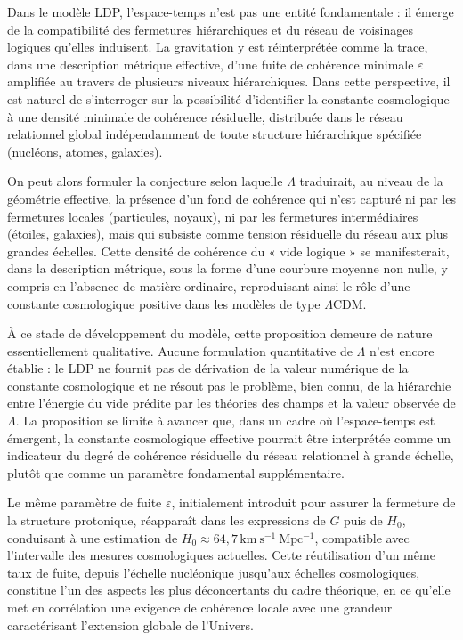 \documentclass[11pt,a4paper]{article}
\begin{document}
Dans le modèle LDP, l’espace-temps n’est pas une entité fondamentale : il émerge de la compatibilité des fermetures hiérarchiques et du réseau de voisinages logiques qu’elles induisent. La gravitation y est réinterprétée comme la trace, dans une description métrique effective, d’une fuite de cohérence minimale \(\varepsilon\) amplifiée au travers de plusieurs niveaux hiérarchiques. Dans cette perspective, il est naturel de s’interroger sur la possibilité d’identifier la constante cosmologique à une densité minimale de cohérence résiduelle, distribuée dans le réseau relationnel global indépendamment de toute structure hiérarchique spécifiée (nucléons, atomes, galaxies). 

On peut alors formuler la conjecture selon laquelle \(\Lambda\) traduirait, au niveau de la géométrie effective, la présence d’un fond de cohérence qui n’est capturé ni par les fermetures locales (particules, noyaux), ni par les fermetures intermédiaires (étoiles, galaxies), mais qui subsiste comme tension résiduelle du réseau aux plus grandes échelles. Cette densité de cohérence du « vide logique » se manifesterait, dans la description métrique, sous la forme d’une courbure moyenne non nulle, y compris en l’absence de matière ordinaire, reproduisant ainsi le rôle d’une constante cosmologique positive dans les modèles de type \(\Lambda\)CDM.

À ce stade de développement du modèle, cette proposition demeure de nature essentiellement qualitative. Aucune formulation quantitative de \(\Lambda\) n’est encore établie : le LDP ne fournit pas de dérivation de la valeur numérique de la constante cosmologique et ne résout pas le problème, bien connu, de la hiérarchie entre l’énergie du vide prédite par les théories des champs et la valeur observée de \(\Lambda\). La proposition se limite à avancer que, dans un cadre où l’espace-temps est émergent, la constante cosmologique effective pourrait être interprétée comme un indicateur du degré de cohérence résiduelle du réseau relationnel à grande échelle, plutôt que comme un paramètre fondamental supplémentaire.

Le même paramètre de fuite \(\varepsilon\), initialement introduit pour assurer la fermeture de la structure protonique, réapparaît dans les expressions de \(G\) puis de \(H_0\), conduisant à une estimation de \(H_0 \approx 64{,}7\,\mathrm{km\ s^{-1}\ Mpc^{-1}}\), compatible avec l’intervalle des mesures cosmologiques actuelles. Cette réutilisation d’un même taux de fuite, depuis l’échelle nucléonique jusqu’aux échelles cosmologiques, constitue l’un des aspects les plus déconcertants du cadre théorique, en ce qu’elle met en corrélation une exigence de cohérence locale avec une grandeur caractérisant l’extension globale de l’Univers.
\end{document}
